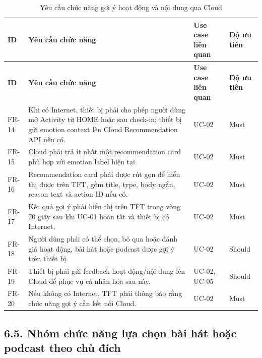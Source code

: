 \documentclass[12pt,a4paper]{article}
\begin{document}
\begin{center}
\scriptsize
\begin{longtable}{|P{0.12\textwidth}|P{0.44\textwidth}|P{0.24\textwidth}|P{0.12\textwidth}|}
\caption{Yêu cầu chức năng gợi ý hoạt động và nội dung qua Cloud}\\
\hline
\textbf{ID} & \textbf{Yêu cầu chức năng} & \textbf{Use case liên quan} & \textbf{Độ ưu tiên} \\
\hline
\endfirsthead
\hline
\textbf{ID} & \textbf{Yêu cầu chức năng} & \textbf{Use case liên quan} & \textbf{Độ ưu tiên} \\
\hline
\endhead
FR-14 & Khi có Internet, thiết bị phải cho phép người dùng mở Activity từ HOME hoặc sau check-in; thiết bị gửi emotion context lên Cloud Recommendation API nếu có. & UC-02 & Must \\
\hline
FR-15 & Cloud phải trả ít nhất một recommendation card phù hợp với emotion label hiện tại. & UC-02 & Must \\
\hline
FR-16 & Recommendation card phải được rút gọn để hiển thị được trên TFT, gồm title, type, body ngắn, reason text và action ID nếu có. & UC-02 & Must \\
\hline
FR-17 & Kết quả gợi ý phải hiển thị trên TFT trong vòng 20 giây sau khi UC-01 hoàn tất và thiết bị có Internet. & UC-02 & Must \\
\hline
FR-18 & Người dùng phải có thể chọn, bỏ qua hoặc đánh giá hoạt động, bài hát hoặc podcast được gợi ý trên thiết bị. & UC-02 & Should \\
\hline
FR-19 & Thiết bị phải gửi feedback hoạt động/nội dung lên Cloud để phục vụ cá nhân hóa sau này. & UC-02, UC-05 & Should \\
\hline
FR-20 & Nếu không có Internet, TFT phải thông báo rằng chức năng gợi ý cần kết nối Cloud. & UC-02 & Must \\
\hline
\end{longtable}
\normalsize
\end{center}

\subsection*{6.5. Nhóm chức năng lựa chọn bài hát hoặc podcast theo chủ đích}
\end{document}
